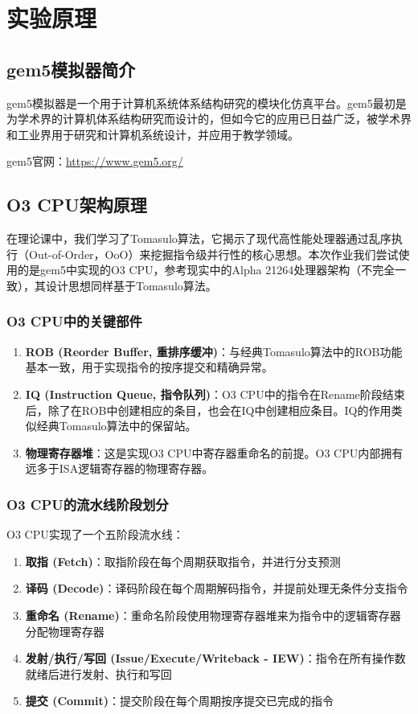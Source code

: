 \documentclass[a4paper]{article}
\begin{document}
\section{实验原理}

\subsection{gem5模拟器简介}

gem5模拟器是一个用于计算机系统体系结构研究的模块化仿真平台。gem5最初是为学术界的计算机体系结构研究而设计的，但如今它的应用已日益广泛，被学术界和工业界用于研究和计算机系统设计，并应用于教学领域。

gem5官网：\url{https://www.gem5.org/}

\subsection{O3 CPU架构原理}

在理论课中，我们学习了Tomasulo算法，它揭示了现代高性能处理器通过乱序执行（Out-of-Order，OoO）来挖掘指令级并行性的核心思想。本次作业我们尝试使用的是gem5中实现的O3 CPU，参考现实中的Alpha 21264处理器架构（不完全一致），其设计思想同样基于Tomasulo算法。

\subsubsection{O3 CPU中的关键部件}

\begin{enumerate}
    \item \textbf{ROB (Reorder Buffer, 重排序缓冲)}：与经典Tomasulo算法中的ROB功能基本一致，用于实现指令的按序提交和精确异常。
    
    \item \textbf{IQ (Instruction Queue, 指令队列)}：O3 CPU中的指令在Rename阶段结束后，除了在ROB中创建相应的条目，也会在IQ中创建相应条目。IQ的作用类似经典Tomasulo算法中的保留站。
    
    \item \textbf{物理寄存器堆}：这是实现O3 CPU中寄存器重命名的前提。O3 CPU内部拥有远多于ISA逻辑寄存器的物理寄存器。
\end{enumerate}

\subsubsection{O3 CPU的流水线阶段划分}

O3 CPU实现了一个五阶段流水线：
\begin{enumerate}
    \item \textbf{取指 (Fetch)}：取指阶段在每个周期获取指令，并进行分支预测
    \item \textbf{译码 (Decode)}：译码阶段在每个周期解码指令，并提前处理无条件分支指令
    \item \textbf{重命名 (Rename)}：重命名阶段使用物理寄存器堆来为指令中的逻辑寄存器分配物理寄存器
    \item \textbf{发射/执行/写回 (Issue/Execute/Writeback - IEW)}：指令在所有操作数就绪后进行发射、执行和写回
    \item \textbf{提交 (Commit)}：提交阶段在每个周期按序提交已完成的指令
\end{enumerate}
\end{document}
